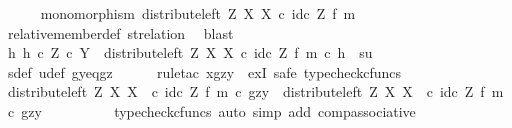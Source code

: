 \begin{isabellebody}
\ \ \ \ \isamarkupfalse%
\ {\isachardoublequoteopen}monomorphism\ {\isacharparenleft}{\kern0pt}distribute{\isacharunderscore}{\kern0pt}left\ Z\ X\ X\ {\isasymcirc}\isactrlsub c\ id\isactrlsub c\ Z\ {\isasymtimes}\isactrlsub f\ m{\isacharparenright}{\kern0pt}{\isachardoublequoteclose}\isanewline
\ \ \ \ \ \ \isamarkupfalse%
\ relative{\isacharunderscore}{\kern0pt}member{\isacharunderscore}{\kern0pt}def{}\ st{\isacharunderscore}{\kern0pt}relation\ \isamarkupfalse%
\ blast\isanewline
\ \ \ \ \isamarkupfalse%
\ {\isachardoublequoteopen}{\isasymexists}h{\isachardot}{\kern0pt}\ h\ {\isasymin}\isactrlsub c\ Z\ {\isasymtimes}\isactrlsub c\ Y\ {\isasymand}\ {\isacharparenleft}{\kern0pt}distribute{\isacharunderscore}{\kern0pt}left\ Z\ X\ X\ {\isasymcirc}\isactrlsub c\ id\isactrlsub c\ Z\ {\isasymtimes}\isactrlsub f\ m{\isacharparenright}{\kern0pt}\ {\isasymcirc}\isactrlsub c\ h\ {\isacharequal}{\kern0pt}\ {\isasymlangle}s{\isacharcomma}{\kern0pt}u{\isasymrangle}{\isachardoublequoteclose}\isanewline
\ \ \ \ \ \ \isamarkupfalse%
\ s{\isacharunderscore}{\kern0pt}def\ u{\isacharunderscore}{\kern0pt}def\ gy{\isacharunderscore}{\kern0pt}eq{\isacharunderscore}{\kern0pt}gz\isanewline
\ \ \ \ \isamarkupfalse%
\ {\isacharparenleft}{\kern0pt}rule{\isacharunderscore}{\kern0pt}tac\ x{\isacharequal}{\kern0pt}{\isachardoublequoteopen}{\isasymlangle}gz{\isacharcomma}{\kern0pt}y{\isasymrangle}{\isachardoublequoteclose}\ \ exI{\isacharcomma}{\kern0pt}\ safe{\isacharcomma}{\kern0pt}\ typecheck{\isacharunderscore}{\kern0pt}cfuncs{\isacharparenright}{\kern0pt}\isanewline
\ \ \ \ \ \ \isamarkupfalse%
\ {\isachardoublequoteopen}{\isacharparenleft}{\kern0pt}distribute{\isacharunderscore}{\kern0pt}left\ Z\ X\ X\ \ {\isasymcirc}\isactrlsub c\ {\isacharparenleft}{\kern0pt}id\isactrlsub c\ Z\ {\isasymtimes}\isactrlsub f\ m{\isacharparenright}{\kern0pt}{\isacharparenright}{\kern0pt}\ {\isasymcirc}\isactrlsub c\ {\isasymlangle}gz{\isacharcomma}{\kern0pt}y{\isasymrangle}\ {\isacharequal}{\kern0pt}\ distribute{\isacharunderscore}{\kern0pt}left\ Z\ X\ X\ \ {\isasymcirc}\isactrlsub c\ {\isacharparenleft}{\kern0pt}id\isactrlsub c\ Z\ {\isasymtimes}\isactrlsub f\ m{\isacharparenright}{\kern0pt}\ {\isasymcirc}\isactrlsub c\ {\isasymlangle}gz{\isacharcomma}{\kern0pt}y{\isasymrangle}{\isachardoublequoteclose}\isanewline
\ \ \ \ \ \ \ \ \isamarkupfalse%
\ {\isacharparenleft}{\kern0pt}typecheck{\isacharunderscore}{\kern0pt}cfuncs{\isacharcomma}{\kern0pt}\ auto\ simp\ add{\isacharcolon}{\kern0pt}\ comp{\isacharunderscore}{\kern0pt}associative{}{\isacharparenright}{\kern0pt}\isanewline

\end{isabellebody}
